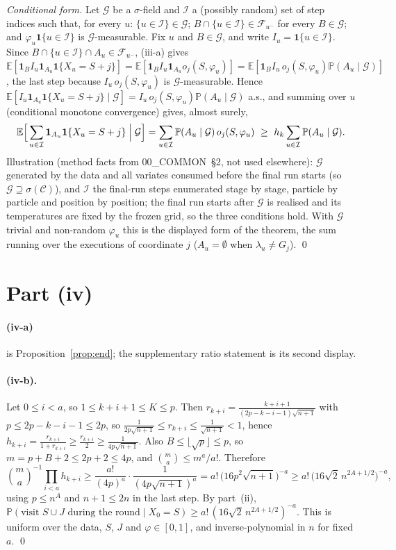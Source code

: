 \documentclass[11pt]{article}
\theoremstyle{definition}
\renewcommand{\Pr}{\mathbb P}
\newcommand{\E}{\mathbb E}
\newcommand{\cF}{\mathcal F}
\newcommand{\cG}{\mathcal G}
\newcommand{\ph}{\varphi}
\newcommand{\one}{\mathbf 1}
\begin{document}
\emph{Conditional form.} Let $\cG$ be a $\sigma$-field and $\mathcal I$ a (possibly random) set of step indices such that, for every $u$: $\{u\in\mathcal I\}\in\cG$; $B\cap\{u\in\mathcal I\}\in\cF_{u^-}$ for every $B\in\cG$; and $\ph_u\one\{u\in\mathcal I\}$ is $\cG$-measurable. Fix $u$ and $B\in\cG$, and write $I_u=\one\{u\in\mathcal I\}$. Since $B\cap\{u\in\mathcal I\}\cap A_u\in\cF_{u^-}$, (iii-a) gives
$\E[\one_BI_u\one_{A_u}\one\{X_u=S+j\}]=\E[\one_BI_u\one_{A_u}o_j(S,\ph_u)]=\E[\one_BI_u\,o_j(S,\ph_u)\Pr(A_u\mid\cG)]$, the last step because $I_u\,o_j(S,\ph_u)$ is $\cG$-measurable. Hence $\E[I_u\one_{A_u}\one\{X_u=S+j\}\mid\cG]=I_u\,o_j(S,\ph_u)\Pr(A_u\mid\cG)$ a.s., and summing over $u$ (conditional monotone convergence) gives, almost surely,
\[
\E\Big[\sum_{u\in\mathcal I}\one_{A_u}\one\{X_u=S+j\}\Bigm|\cG\Big]=\sum_{u\in\mathcal I}\Pr(A_u\mid\cG)\,o_j(S,\ph_u)\ \ge\ h_k\sum_{u\in\mathcal I}\Pr(A_u\mid\cG).
\]
Illustration (method facts from 00\_COMMON~\S2, not used elsewhere): $\cG$ generated by the data and all variates consumed before the final run starts (so $\cG\supseteq\sigma(\mathcal C)$), and $\mathcal I$ the final-run steps enumerated stage by stage, particle by particle and position by position; the final run starts after $\cG$ is realised and its temperatures are fixed by the frozen grid, so the three conditions hold. With $\cG$ trivial and non-random $\ph_u$ this is the displayed form of the theorem, the sum running over the executions of coordinate $j$ ($A_u=\emptyset$ when $\lambda_u\ne G_j$). \qed

\section{Part (iv)}

\paragraph{(iv-a)} is Proposition~\ref{prop:end}; the supplementary ratio statement is its second display.

\paragraph{(iv-b).} Let $0\le i<a$, so $1\le k+i+1\le K\le p$. Then $r_{k+i}=\frac{k+i+1}{(2p-k-i-1)\sqrt{n+1}}$ with $p\le2p-k-i-1\le2p$, so $\frac1{2p\sqrt{n+1}}\le r_{k+i}\le\frac1{\sqrt{n+1}}<1$, hence $h_{k+i}=\frac{r_{k+i}}{1+r_{k+i}}\ge\frac{r_{k+i}}2\ge\frac1{4p\sqrt{n+1}}$. Also $B\le\lfloor\sqrt p\rfloor\le p$, so $m=p+B+2\le2p+2\le4p$, and $\binom ma\le m^a/a!$. Therefore
\[
\binom ma^{-1}\prod_{i<a}h_{k+i}\ge\frac{a!}{(4p)^a}\cdot\frac1{(4p\sqrt{n+1})^a}=a!\,\big(16p^2\sqrt{n+1}\big)^{-a}\ge a!\,\big(16\sqrt2\,n^{2A+1/2}\big)^{-a},
\]
using $p\le n^A$ and $n+1\le2n$ in the last step. By part~(ii), $\Pr(\text{visit }S\cup J\text{ during the round}\mid X_0=S)\ge a!\,(16\sqrt2\,n^{2A+1/2})^{-a}$. This is uniform over the data, $S$, $J$ and $\ph\in[0,1]$, and inverse-polynomial in $n$ for fixed $a$. \qed
\end{document}
